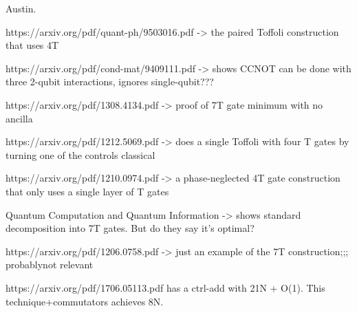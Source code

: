 \documentclass[twocolumn,longbibliography]{quantumarticle-customized}
\begin{document}
Austin.





\cite{barenco1995}
https://arxiv.org/pdf/quant-ph/9503016.pdf   ->   the paired Toffoli construction that uses 4T

https://arxiv.org/pdf/cond-mat/9409111.pdf   -> shows CCNOT can be done with three 2-qubit interactions, ignores single-qubit???


https://arxiv.org/pdf/1308.4134.pdf -> proof of 7T gate minimum with no ancilla

https://arxiv.org/pdf/1212.5069.pdf  ->   does a single Toffoli with four T gates by turning one of the controls classical

https://arxiv.org/pdf/1210.0974.pdf  ->   a phase-neglected 4T gate construction that only uses a single layer of T gates


Quantum Computation and Quantum Information -> shows standard decomposition into 7T gates. But do they say it's optimal?

https://arxiv.org/pdf/1206.0758.pdf -> just an example of the 7T construction;;; probablynot relevant



https://arxiv.org/pdf/1706.05113.pdf   has a ctrl-add with 21N + O(1). This technique+commutators achieves 8N.
\end{document}

